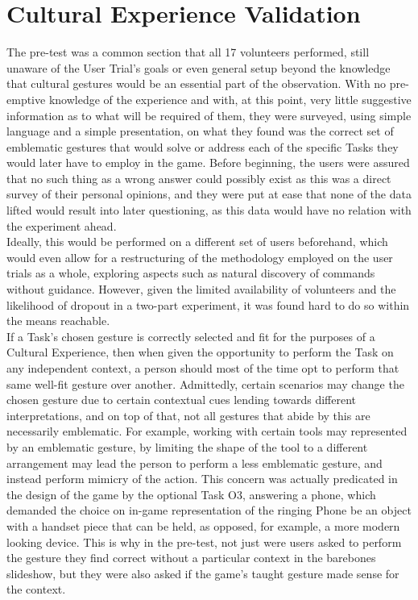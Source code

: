 \section{Cultural Experience Validation} \label{sec:results_culturalvalidation}
    The pre-test was a common section that all 17 volunteers performed, still unaware of the User Trial’s goals or even general setup beyond the knowledge that cultural gestures would be an essential part of the observation. With no pre-emptive knowledge of the experience and with, at this point, very little suggestive information as to what will be required of them, they were surveyed, using simple language and a simple presentation, on what they found was the correct set of emblematic gestures that would solve or address each of the specific Tasks they would later have to employ in the game. Before beginning, the users were assured that no such thing as a wrong answer could possibly exist as this was a direct survey of their personal opinions, and they were put at ease that none of the data lifted would result into later questioning, as this data would have no relation with the experiment ahead.\\
    Ideally, this would be performed on a different set of users beforehand, which would even allow for a restructuring of the methodology employed on the user trials as a whole, exploring aspects such as natural discovery of commands without guidance. However, given the limited availability of volunteers and the likelihood of dropout in a two-part experiment, it was found hard to do so within the means reachable.\\
    If a Task’s chosen gesture is correctly selected and fit for the purposes of a Cultural Experience, then when given the opportunity to perform the Task on any independent context, a person should most of the time opt to perform that same well-fit gesture over another. Admittedly, certain scenarios may change the chosen gesture due to certain contextual cues lending towards different interpretations, and on top of that, not all gestures that abide by this are necessarily emblematic. For example, working with certain tools may represented by an emblematic gesture, by limiting the shape of the tool to a different arrangement may lead the person to perform a less emblematic gesture, and instead perform mimicry of the action. This concern was actually predicated in the design of the game by the optional Task O3, answering a phone, which demanded the choice on in-game representation of the ringing Phone be an object with a handset piece that can be held, as opposed, for example, a more modern looking device. This is why in the pre-test, not just were users asked to perform the gesture they find correct without a particular context in the barebones slideshow, but they were also asked if the game’s taught gesture made sense for the context.\\

